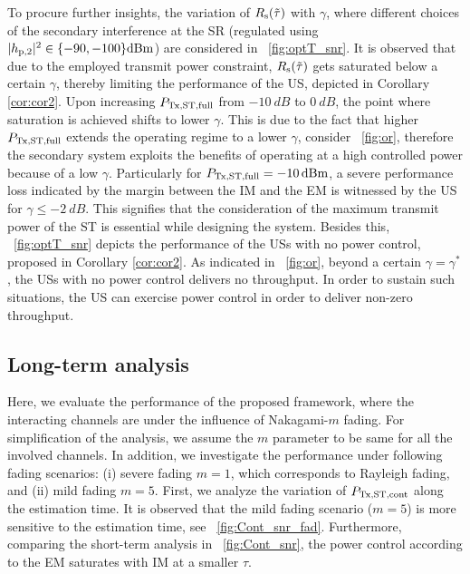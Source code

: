 To procure further insights, the variation of $R_{\text{s}}(\tilde{\tau})$ with $\gamma$, where different choices of the secondary interference at the SR (regulated using $|h_{\text{p,2}}|^2 \in \{-90, -100\} \SI{}{dBm}$) are considered in \figurename~\ref{fig:optT_snr}. It is observed that due to the employed transmit power constraint, $R_{\text{s}}(\tilde{\tau})$ gets saturated below a certain $\gamma$, thereby limiting the performance of the US, depicted in Corollary \ref{cor:cor2}. Upon increasing $P_{\text{Tx,ST,full}}$ from $\SI{-10}{dB}$ to $\SI{0}{dB}$, the point where saturation is achieved shifts to lower $\gamma$. This is due to the fact that higher $P_{\text{Tx,ST,full}}$ extends the operating regime to a lower $\gamma$, consider \figurename~\ref{fig:or}, therefore the secondary system exploits the benefits of operating at a high controlled power because of a low $\gamma$. Particularly for $P_{\text{Tx,ST,full}} = \SI{-10}{dBm}$, a severe performance loss indicated by the margin between the IM and the EM is witnessed by the US for $\gamma \le \SI{-2}{dB}$. This signifies that the consideration of the maximum transmit power of the ST is essential while designing the system. Besides this, \figurename~\ref{fig:optT_snr} depicts the performance of the USs with no power control, proposed in Corollary \ref{cor:cor2}. As indicated in \figurename~\ref{fig:or}, beyond a certain $\gamma = \gamma^*$, the USs with no power control delivers no throughput. In order to sustain such situations, the US can exercise power control in order to deliver non-zero throughput. 
\subsection{Long-term analysis} 
Here, we evaluate the performance of the proposed framework, where the interacting channels are under the influence of Nakagami-$m$ fading. For simplification of the analysis, we assume the $m$ parameter to be same for all the involved channels. In addition, we investigate the performance under following fading scenarios: (i) severe fading $m=1$, which corresponds to Rayleigh fading, and (ii) mild fading $m = 5$. First, we analyze the variation of $P_{\text{Tx,ST,cont}}$ along the estimation time. It is observed that the mild fading scenario ($m = 5$) is more sensitive to the estimation time, see \figurename~\ref{fig:Cont_snr_fad}. Furthermore, comparing the short-term analysis in \figurename~\ref{fig:Cont_snr}, the power control according to the EM saturates with IM at a smaller $\tau$. 

